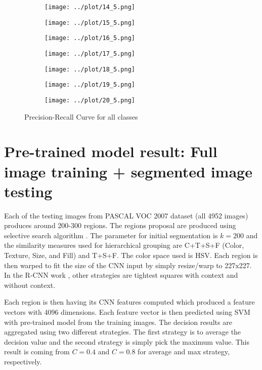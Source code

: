 \documentclass{article}
\begin{document}
\begin{figure}[H]
\begin{subfigure}[h]{0.15\textwidth}
		\texttt{[image: ../plot/14\_5.png]}
	\end{subfigure}
	\begin{subfigure}{0.15\textwidth}
		\texttt{[image: ../plot/15\_5.png]}
	\end{subfigure}
	\begin{subfigure}{0.15\textwidth}
		\texttt{[image: ../plot/16\_5.png]}
	\end{subfigure}
	\begin{subfigure}{0.15\textwidth}
		\texttt{[image: ../plot/17\_5.png]}
	\end{subfigure}
	\begin{subfigure}{0.15\textwidth}
		\texttt{[image: ../plot/18\_5.png]}
	\end{subfigure}
	\begin{subfigure}{0.15\textwidth}
		\texttt{[image: ../plot/19\_5.png]}
	\end{subfigure}
	\begin{subfigure}{0.15\textwidth}
		\texttt{[image: ../plot/20\_5.png]}
	\end{subfigure}
	\caption{Precision-Recall Curve for all classes}
	\label{fig:pre_rec_base}
\end{figure}

\section{Pre-trained model result: Full image training + segmented image testing}

Each of the testing images from PASCAL VOC 2007 dataset (all 4952 images) produces around 200-300 regions. The regions proposal are produced using selective search algorithm \cite{uijlings2013}. The parameter for initial segmentation is $k=200$ and the similarity measures used for hierarchical grouping are C+T+S+F (Color, Texture, Size, and Fill) and T+S+F. The color space used is HSV. Each region is then warped to fit the size of the CNN input by simply resize/warp to 227x227. In the R-CNN work \cite{girshick2013}, other strategies are tightest squares with context and without context.

Each region is then having its CNN features computed which produced a feature vectors with 4096 dimensions. Each feature vector is then predicted using SVM with pre-trained model from the training images. The decision results are aggregated using two different strategies. The first strategy is to average the decision value and the second strategy is simply pick the maximum value. This result is coming from $C=0.4$ and $C=0.8$ for average and max strategy, respectively.
\end{document}

